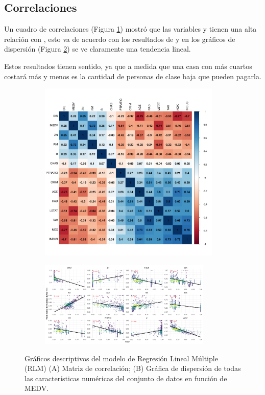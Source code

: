 \documentclass[11pt, letterpaper]{article}
\begin{document}
\subsection{Correlaciones}
Un cuadro de correlaciones (Figura \ref{fig:corrplot}) mostró que las variables  y  tienen una alta relación con , esto va de acuerdo con los resultados de  y en los gráficos de dispersión (Figura \ref{fig:scatter}) se ve claramente una tendencia lineal. 

Estos resultados tienen sentido, ya que a medida que una casa con más cuartos costará más y menos es la cantidad de personas de clase baja que pueden pagarla.

\begin{figure}[htb!]
\begin{subfigure}[t]{0.35\textwidth}
	\centering
	\includegraphics[width=0.95\textwidth]{figuras/corrplot.png}
	\caption{}
	\label{fig:corrplot}
\end{subfigure}
\hfill
\begin{subfigure}[t]{0.65\textwidth}
	\centering
	\includegraphics[width=0.90\textwidth]{figuras/scatter.png}
	\caption{}
	\label{fig:scatter}
\end{subfigure}
\caption{Gráficos descriptivos del modelo de Regresión Lineal Múltiple (RLM) (A) Matriz de correlación; (B) Gráfica de dispersión de todas las características numéricas del conjunto de datos en función de MEDV.}
\label{fig:regresion_descriptiva}
\end{figure}
\end{document}
